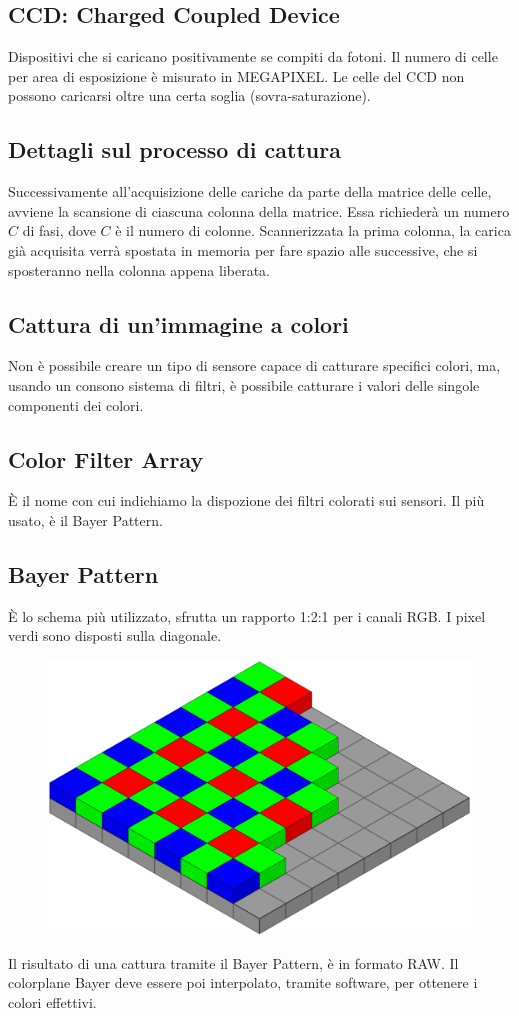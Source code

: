 \documentclass{report}
\begin{document}
	\subsection{CCD: Charged Coupled Device}
	Dispositivi che si caricano positivamente se compiti da fotoni. Il numero di celle per area di esposizione è misurato in MEGAPIXEL. Le celle del CCD non possono caricarsi oltre una certa soglia (sovra-saturazione).
		
	\subsection{Dettagli sul processo di cattura}
	Successivamente all'acquisizione delle cariche da parte della matrice delle celle, avviene la scansione di ciascuna colonna della matrice. Essa richiederà un numero $C$ di fasi, dove $C$ è il numero di colonne. Scannerizzata la prima colonna, la carica già acquisita verrà spostata in memoria per fare spazio alle successive, che si sposteranno nella colonna appena liberata.
		
	\subsection{Cattura di un'immagine a colori}
	Non è possibile creare un tipo di sensore capace di catturare specifici colori, ma, usando un consono sistema di filtri, è possibile catturare i valori delle singole componenti dei colori.
		
	\subsection{Color Filter Array}
	È il nome con cui indichiamo la dispozione dei filtri colorati sui sensori. Il più usato, è il Bayer Pattern.
		
	\subsection{Bayer Pattern}
	È lo schema più utilizzato, sfrutta un rapporto 1:2:1 per i canali RGB. I pixel verdi sono disposti sulla diagonale.
		
	\begin{figure}[htp]
		\centering
		\includegraphics[width=0.5\linewidth]{bayer.png}
	\end{figure}
	Il risultato di una cattura tramite il Bayer Pattern, è in formato RAW. Il colorplane Bayer deve essere poi interpolato, tramite software, per ottenere i colori effettivi.
		
\end{document}
